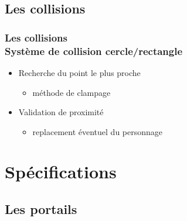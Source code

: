 \documentclass{beamer}
\begin{document}
\subsection{Les collisions}

\begin{frame}
    \frametitle{Les collisions \\
                \small Système de collision cercle/rectangle}
    \begin{block}{}
        \begin{itemize}
            \item Recherche du point le plus proche
            \begin{itemize}
                \item méthode de clampage
            \end{itemize}
            \item Validation de proximité
            \begin{itemize}
                \item replacement éventuel du personnage
            \end{itemize}
        \end{itemize}
    \end{block}
\end{frame}

\section{Spécifications}
\subsection{Les portails}
\end{document}
